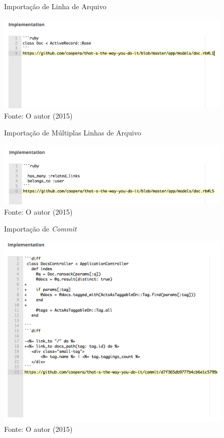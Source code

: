 \begin{figure}[h]
	\centering
    \caption{Importação de Linha de Arquivo}
    \includegraphics[width=15cm]{Imagens/import-line.png}
	\caption*{Fonte: O autor (2015)}
\end{figure}

\begin{figure}[h]
	\centering
    \caption{Importação de Múltiplas Linhas de Arquivo}
    \includegraphics[width=15cm]{Imagens/import-lines.png}
	\caption*{Fonte: O autor (2015)}
\end{figure}

\begin{figure}[h]
	\centering
    \caption{Importação de \textit{Commit}}
    \includegraphics[width=15cm]{Imagens/import-commit.png}
	\caption*{Fonte: O autor (2015)}
\end{figure}

